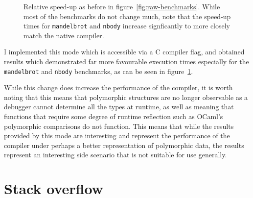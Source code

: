 \begin{figure}
    \centering

    \caption{Relative speed-up as before in figure~\ref{fig:raw-benchmarks}.
    While most of the benchmarks do not change much, note that the speed-up
    times for \texttt{mandelbrot} and \texttt{nbody} increase signficantly to
    more closely match the native compiler.}

    \label{fig:benchmarks-no-alloc}
\end{figure}

I implemented this mode which is accessible via a C compiler flag, and obtained
results which demonstrated far more favourable execution times especially for
the \texttt{mandelbrot} and \texttt{nbody} benchmarks, as can be seen in
figure~\ref{fig:benchmarks-no-alloc}.

While this change does increase the performance of the compiler, it is worth
noting that this means that polymorphic structures are no longer observable as a
debugger cannot determine all the types at runtime, as well as meaning that
functions that require some degree of runtime reflection such as OCaml's
polymorphic comparisons do not function. This means that while the results
provided by this mode are interesting and represent the performance of the
compiler under perhaps a better representation of polymorphic data, the results
represent an interesting side scenario that is not suitable for use generally.

\section{Stack overflow} \label{stack-overflow}

